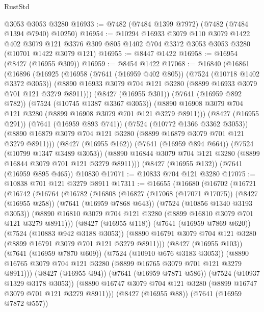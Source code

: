 \begin{lexlean}{RustStd}
\begin{coremodule}
    @3053
    @3053
    @3280
@16933 := @7482 (@7484 @1399 @7972) (@7482 (@7484 @1394 @7940) @10250)
@16954 := @10294
    @16933
    @3079
    @110
    @3079
    @1422
    @402
    @3079
    @121
    @3376
    @309
    @805
    @1402
    @704
    @3372
    @3053
    @3053
    @3280
    (@10701 @1422 @3079 @121)
@16955 := @8447 @1422
@16958 := @16954 (@8427 (@16955 @309))
@16959 := @8454 @1422
@17068 := @16840
    (@16861
      (@16896
        (@16925
          (@16958
            (@7641 (@16959 @402 @805))
            (@7524 (@10718 @1402 @3372 @3053))
            (@8890 @16933 @3079 @704 @121 @3280 (@8899 @16933 @3079 @701 @121 @3279 @8911)))
          (@8427 (@16955 @301))
          (@7641 (@16959 @892 @782))
          (@7524 (@10745 @1387 @3367 @3053))
          (@8890 @16908 @3079 @704 @121 @3280 (@8899 @16908 @3079 @701 @121 @3279 @8911)))
        (@8427 (@16955 @291))
        (@7641 (@16959 @893 @741))
        (@7524 (@10772 @1366 @3362 @3053))
        (@8890 @16879 @3079 @704 @121 @3280 (@8899 @16879 @3079 @701 @121 @3279 @8911)))
      (@8427 (@16955 @162))
      (@7641 (@16959 @894 @664))
      (@7524 (@10799 @1347 @3489 @3053))
      (@8890 @16844 @3079 @704 @121 @3280 (@8899 @16844 @3079 @701 @121 @3279 @8911)))
    (@8427 (@16955 @132))
    (@7641 (@16959 @895 @465))
    @10830
@17071 := @10833 @704 @121 @3280
@17075 := @10838 @701 @121 @3279 @8911
@17311 := @16655
    (@16680
      (@16702
        (@16721
          (@16742
            (@16764
              (@16782
                (@16808
                  (@16827
                    (@17068 (@17071 @17075))
                    (@8427 (@16955 @258))
                    (@7641 (@16959 @7868 @643))
                    (@7524 (@10856 @1340 @3193 @3053))
                    (@8890 @16810 @3079 @704 @121 @3280 (@8899 @16810 @3079 @701 @121 @3279 @8911)))
                  (@8427 (@16955 @118))
                  (@7641 (@16959 @7869 @620))
                  (@7524 (@10883 @942 @3188 @3053))
                  (@8890 @16791 @3079 @704 @121 @3280 (@8899 @16791 @3079 @701 @121 @3279 @8911)))
                (@8427 (@16955 @103))
                (@7641 (@16959 @7870 @609))
                (@7524 (@10910 @676 @3183 @3053))
                (@8890 @16765 @3079 @704 @121 @3280 (@8899 @16765 @3079 @701 @121 @3279 @8911)))
              (@8427 (@16955 @94))
              (@7641 (@16959 @7871 @586))
              (@7524 (@10937 @1329 @3178 @3053))
              (@8890 @16747 @3079 @704 @121 @3280 (@8899 @16747 @3079 @701 @121 @3279 @8911)))
            (@8427 (@16955 @88))
            (@7641 (@16959 @7872 @557))

\end{coremodule}
\end{lexlean}

